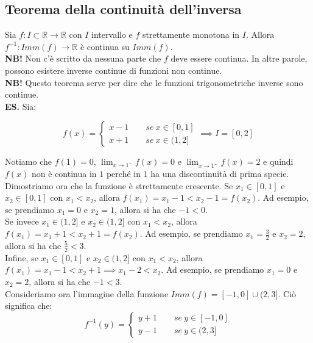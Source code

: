 \documentclass{article}
\begin{document}
\subsection{Teorema della continuità dell'inversa}
Sia $f: I \subset \mathbb{R} \xrightarrow{} \mathbb{R}$ con $I$ intervallo e $f$ strettamente monotona in $I$. Allora $f^{-1}: Imm(f) \xrightarrow{} \mathbb{R}$ è continua su $Imm(f)$.\\

\noindent\textbf{NB!} Non c'è scritto da nessuna parte che $f$ deve essere continua. In altre parole, possono esistere inverse continue di funzioni non continue. \\

\noindent\textbf{NB!} Questo teorema serve per dire che le funzioni trigonometriche inverse sono continue.\\

\noindent\textbf{ES.} Sia:

\begin{equation*}
    f(x) = \begin{cases}
        x - 1 \qquad se \ x \in [0, 1] \\
        x + 1 \qquad se \ x \in (1, 2]
    \end{cases}
    \implies I = [0, 2]
\end{equation*}

\noindent Notiamo che $f(1) = 0$, $\lim_{x \to 1^-} f(x) = 0$ e $\lim_{x \to 1^+} f(x) = 2$ e quindi $f(x)$ non è continua in $1$ perché in $1$ ha una discontinuità di prima specie.\\
\noindent Dimostriamo ora che la funzione è strettamente crescente. Se $x_1 \in [0, 1]$ e $x_2 \in [0, 1]$ con $x_1 < x_2$, allora $f(x_1) = x_1 - 1 < x_2 - 1 = f(x_2)$. Ad esempio, se prendiamo $x_1 = 0$ e $x_2 = 1$, allora si ha che $-1 < 0$.\\
Se invece $x_1 \in (1, 2]$ e $x_2 \in (1, 2]$ con $x_1 < x_2$, allora $f(x_1) = x_1 + 1 < x_2 + 1 = f(x_2)$. Ad esempio, se prendiamo $x_1 = \frac{3}{2}$ e $x_2 = 2$, allora si ha che $\frac{5}{2} < 3$.\\
Infine, se $x_1 \in [0, 1]$ e $x_2 \in (1, 2]$ con $x_1 < x_2$, allora $f(x_1) = x_1 - 1 < x_2 + 1 \implies x_1 - 2 < x_2$. Ad esempio, se prendiamo $x_1 = 0$ e $x_2 = 2$, allora si ha che $-1 < 3$.\\
Consideriamo ora l'immagine della funzione $Imm(f) = [-1, 0] \cup (2, 3]$. Ciò significa che:
\begin{equation*}
    f^{-1}(y) = \begin{cases}
        y + 1 \qquad se \ y \in [-1, 0]\\
        y - 1 \qquad se \ y \in (2, 3]
    \end{cases}
\end{equation*}
\end{document}
